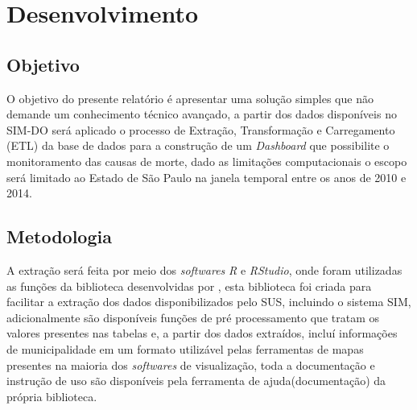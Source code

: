 

\chapter{Desenvolvimento}\label{cap_exemplos}

\section{Objetivo}

O objetivo do presente relatório é apresentar uma solução simples que não demande um conhecimento técnico avançado, a partir dos dados disponíveis no SIM-DO será aplicado o processo de Extração, Transformação e Carregamento (ETL) da base de dados para a construção de um \textit{Dashboard} que possibilite o monitoramento das causas de morte, dado as limitações computacionais o escopo será limitado ao Estado de São Paulo na janela temporal entre os anos de 2010 e 2014.

\section{Metodologia}

A extração será feita por meio dos \textit{softwares} \textit{R} e \textit{RStudio}, onde foram utilizadas as funções da biblioteca desenvolvidas por , esta biblioteca foi criada para facilitar a extração dos dados disponibilizados pelo SUS, incluindo o sistema SIM, adicionalmente são disponíveis funções de pré processamento que tratam os valores presentes nas tabelas e, a partir dos dados extraídos, incluí informações de municipalidade em um formato utilizável pelas ferramentas de mapas presentes na maioria dos \textit{softwares} de visualização, toda a documentação e instrução de uso são disponíveis pela ferramenta de ajuda(documentação) da própria biblioteca.




